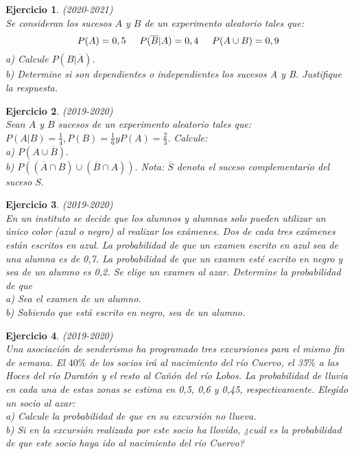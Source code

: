 \documentclass[12pt, a4paper]{amsart}
\newtheorem{ejer}{Ejercicio}
\begin{document}
\begin{ejer}\em (2020-2021)\\
Se consideran los sucesos $A$ y $B$ de un experimento aleatorio tales que:\\
\[P(A) = 0, 5\hspace*{5mm} P(\overline{B} | A) = 0, 4\hspace*{5mm}P(A \cup B) = 0,9\]
a) Calcule $P(B | \overline{A})$.\\
b) Determine si son dependientes o independientes los sucesos A y B. Justifique la respuesta.
\end{ejer}

\begin{ejer}\em (2019-2020)\\
Sean $A$ y $B$ sucesos de un experimento aleatorio tales que: $P (A|B) =\frac{1}{4}, P (B) =\frac{1}{6}y P (A) =\frac{2}{3}.$ Calcule:\\
a) $P (A \cup \overline{B}).$\\
b) $P ((\overline{A} \cap B) \cup (\overline{B} \cap A)).$
Nota: $\overline{S}$ denota el suceso complementario del suceso $S.$
\end{ejer}

\begin{ejer}\em (2019-2020)\\
En un instituto se decide que los alumnos y alumnas solo pueden utilizar un único color (azul o negro) al realizar
los exámenes. Dos de cada tres exámenes están escritos en azul. La probabilidad de que un examen escrito en
azul sea de una alumna es de 0,7. La probabilidad de que un examen esté escrito en negro y sea de un alumno
es 0,2. Se elige un examen al azar. Determine la probabilidad de que\\
a) Sea el examen de un alumno.\\
b) Sabiendo que está escrito en negro, sea de un alumno.
\end{ejer}

\begin{ejer}\em (2019-2020)\\
Una asociación de senderismo ha programado tres excursiones para el mismo fin de semana. El $40\%$ de los
socios irá al nacimiento del río Cuervo, el 35$\%$ a las Hoces del río Duratón y el resto al Cañón del río Lobos.
La probabilidad de lluvia en cada una de estas zonas se estima en 0,5, 0,6 y 0,45, respectivamente. Elegido un
socio al azar:\\
a) Calcule la probabilidad de que en su excursión no llueva.\\
b) Si en la excursión realizada por este socio ha llovido, ¿cuál es la probabilidad de que este socio haya ido al
nacimiento del río Cuervo?
\end{ejer}
\end{document}
